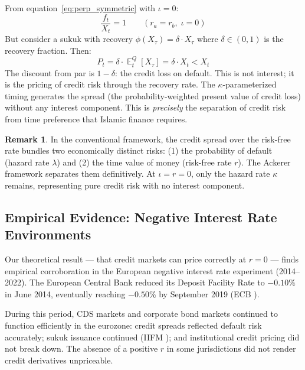 \documentclass[10pt,twocolumn]{article}
\theoremstyle{plain}
\theoremstyle{definition}
\newtheorem{remark}{Remark}
\DeclareMathOperator{\E}{\mathbb{E}}
\begin{document}
From equation~\eqref{eq:perp_symmetric} with $\iota = 0$:
\begin{equation}
\frac{f_t}{X_t} = 1
\qquad (r_a = r_b,\;\iota = 0)
\label{eq:parity}
\end{equation}
But consider a sukuk with recovery $\phi(X_\tau) = \delta \cdot X_\tau$
where $\delta \in (0,1)$ is the recovery fraction. Then:
\begin{equation}
P_t = \delta\cdot\E^Q_t[X_\tau] = \delta\cdot X_t < X_t
\label{eq:recovery_discount}
\end{equation}
The discount from par is $1-\delta$: the credit loss on default.
This is not interest; it is the pricing of credit risk through
the recovery rate. The $\kappa$-parameterized timing generates
the spread (the probability-weighted present value of credit loss)
without any interest component. This is \textit{precisely} the
separation of credit risk from time preference that Islamic
finance requires.

\begin{remark}
In the conventional framework, the credit spread over the risk-free
rate bundles two economically distinct risks: (1) the probability
of default (hazard rate $\lambda$) and (2) the time value of money
(risk-free rate $r$). The Ackerer framework separates them
definitively. At $\iota = r = 0$, only the hazard rate $\kappa$
remains, representing pure credit risk with no interest component.
\end{remark}

\subsection{Empirical Evidence: Negative Interest Rate Environments}
\label{sec:negative_rates}

Our theoretical result --- that credit markets can price correctly
at $r = 0$ --- finds empirical corroboration in the European
negative interest rate experiment (2014--2022). The European Central
Bank reduced its Deposit Facility Rate to $-0.10\%$ in June 2014,
eventually reaching $-0.50\%$ by September 2019 (ECB \cite{ECB2019}).

During this period, CDS markets and corporate bond markets continued
to function efficiently in the eurozone: credit spreads reflected
default risk accurately; sukuk issuance continued (IIFM
\cite{IIFM2023}); and institutional credit pricing did not break
down. The absence of a positive $r$ in some jurisdictions did not
render credit derivatives unpriceable.
\end{document}

